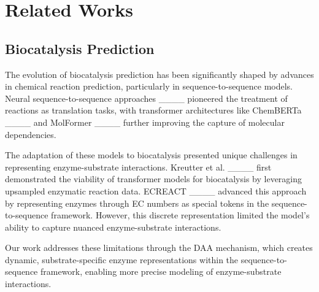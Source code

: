 \section{Related Works}
\subsection{Biocatalysis Prediction}
The evolution of biocatalysis prediction has been significantly shaped by advances in chemical reaction prediction, particularly in sequence-to-sequence models. Neural sequence-to-sequence approaches ____ pioneered the treatment of reactions as translation tasks, with transformer architectures like ChemBERTa ____ and MolFormer ____ further improving the capture of molecular dependencies.

The adaptation of these models to biocatalysis presented unique challenges in representing enzyme-substrate interactions. Kreutter et al. ____ first demonstrated the viability of transformer models for biocatalysis by leveraging upsampled enzymatic reaction data. ECREACT ____ advanced this approach by representing enzymes through EC numbers as special tokens in the sequence-to-sequence framework. However, this discrete representation limited the model's ability to capture nuanced enzyme-substrate interactions.

Our work addresses these limitations through the DAA mechanism, which creates dynamic, substrate-specific enzyme representations within the sequence-to-sequence framework, enabling more precise modeling of enzyme-substrate interactions.


